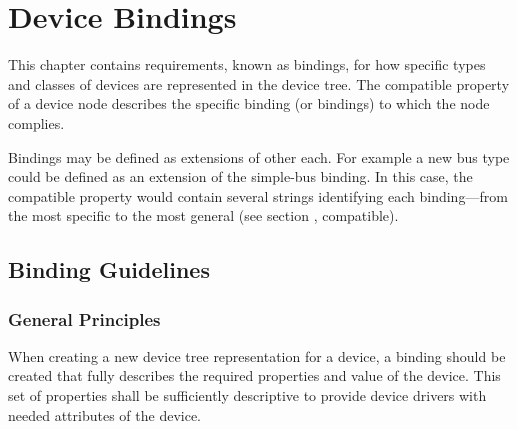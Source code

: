 \documentclass[a4paper,10pt,oneside]{sphinxmanual}
\begin{document}
\chapter{Device Bindings}
\label{device-bindings::doc}\label{device-bindings:device-bindings}\label{device-bindings:chapter-device-bindings}
This chapter contains requirements, known as bindings, for how specific
types and classes of devices are represented in the device tree. The
compatible property of a device node describes the specific binding (or
bindings) to which the node complies.

Bindings may be defined as extensions of other each. For example a new
bus type could be defined as an extension of the simple-bus binding. In
this case, the compatible property would contain several strings
identifying each binding—from the most specific to the most general (see
section {\hyperref[devicetree\string-basics:sect\string-standard\string-properties\string-compatible]{}}, compatible).


\section{Binding Guidelines}
\label{device-bindings:binding-guidelines}

\subsection{General Principles}
\label{device-bindings:general-principles}
When creating a new device tree representation for a device, a binding
should be created that fully describes the required properties and value
of the device. This set of properties shall be sufficiently descriptive
to provide device drivers with needed attributes of the device.
\end{document}
